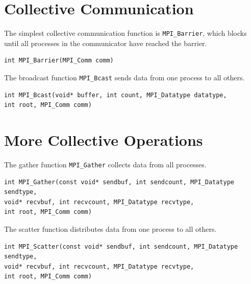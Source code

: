 \documentclass[letterpaper]{report}
\begin{document}
\chapter{Collective Communication}

The simplest collective communication function is \texttt{MPI\_Barrier}, which blocks
until all processes in the communicator have reached the barrier.

\begin{verbatim}
int MPI_Barrier(MPI_Comm comm)
\end{verbatim}

The broadcast function \texttt{MPI\_Bcast} sends data from one process to all others.

\begin{verbatim}
int MPI_Bcast(void* buffer, int count, MPI_Datatype datatype,
int root, MPI_Comm comm)
\end{verbatim}

\chapter{More Collective Operations}

The gather function \texttt{MPI\_Gather} collects data from all processes.

\begin{verbatim}
int MPI_Gather(const void* sendbuf, int sendcount, MPI_Datatype sendtype,
void* recvbuf, int recvcount, MPI_Datatype recvtype,
int root, MPI_Comm comm)
\end{verbatim}

The scatter function distributes data from one process to all others.

\begin{verbatim}
int MPI_Scatter(const void* sendbuf, int sendcount, MPI_Datatype sendtype,
void* recvbuf, int recvcount, MPI_Datatype recvtype,
int root, MPI_Comm comm)
\end{verbatim}
\end{document}
